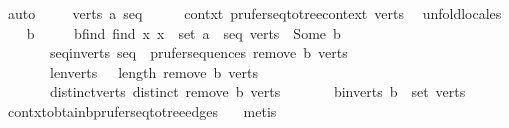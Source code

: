 \begin{isabellebody}
\ auto\isanewline
{}\isamarkupfalse%
\isanewline
\ \ \isamarkupfalse%
\ {\isacharparenleft}{\kern0pt}{}\ verts\ a\ seq{\isacharparenright}{\kern0pt}\isanewline
\ \ \isamarkupfalse%
\ \isamarkupfalse%
\ contxt{\isacharcolon}{\kern0pt}\ prufer{\isacharunderscore}{\kern0pt}seq{\isacharunderscore}{\kern0pt}to{\isacharunderscore}{\kern0pt}tree{\isacharunderscore}{\kern0pt}context\ verts\ \isamarkupfalse%
\ unfold{\isacharunderscore}{\kern0pt}locales\isanewline
\ \ \isamarkupfalse%
\ b\isanewline
\ \ \ \ \ b{\isacharunderscore}{\kern0pt}find{\isacharcolon}{\kern0pt}\ {\isachardoublequoteopen}find\ {\isacharparenleft}{\kern0pt}{\isasymlambda}x{\isachardot}{\kern0pt}\ x\ {\isasymnotin}\ set\ {\isacharparenleft}{\kern0pt}a\ {\isacharhash}{\kern0pt}\ seq{\isacharparenright}{\kern0pt}{\isacharparenright}{\kern0pt}\ verts\ {\isacharequal}{\kern0pt}\ Some\ b{\isachardoublequoteclose}\isanewline
\ \ \ \ \ \ \ seq{\isacharunderscore}{\kern0pt}in{\isacharunderscore}{\kern0pt}verts{\isacharprime}{\kern0pt}{\isacharcolon}{\kern0pt}\ {\isachardoublequoteopen}seq\ {\isasymin}\ prufer{\isacharunderscore}{\kern0pt}sequences\ {\isacharparenleft}{\kern0pt}remove{}\ b\ verts{\isacharparenright}{\kern0pt}{\isachardoublequoteclose}\isanewline
\ \ \ \ \ \ \ len{\isacharunderscore}{\kern0pt}verts{\isacharprime}{\kern0pt}{\isacharcolon}{\kern0pt}\ {\isachardoublequoteopen}{}\ {\isasymle}\ length\ {\isacharparenleft}{\kern0pt}remove{}\ b\ verts{\isacharparenright}{\kern0pt}{\isachardoublequoteclose}\isanewline
\ \ \ \ \ \ \ distinct{\isacharunderscore}{\kern0pt}verts{\isacharprime}{\kern0pt}{\isacharcolon}{\kern0pt}\ {\isachardoublequoteopen}distinct\ {\isacharparenleft}{\kern0pt}remove{}\ b\ verts{\isacharparenright}{\kern0pt}{\isachardoublequoteclose}\isanewline
\ \ \ \ \ \ \ b{\isacharunderscore}{\kern0pt}in{\isacharunderscore}{\kern0pt}verts{\isacharcolon}{\kern0pt}\ {\isachardoublequoteopen}b\ {\isasymin}\ set\ verts{\isachardoublequoteclose}\isanewline
\ \ \ \ \isamarkupfalse%
\ contxt{\isachardot}{\kern0pt}obtain{\isacharunderscore}{\kern0pt}b{\isacharunderscore}{\kern0pt}prufer{\isacharunderscore}{\kern0pt}seq{\isacharunderscore}{\kern0pt}to{\isacharunderscore}{\kern0pt}tree{\isacharunderscore}{\kern0pt}edges\ {}\ \isamarkupfalse%
\ metis\isanewline
\ \ \isamarkupfalse%
\ \isamarkupfalse%

\end{isabellebody}
